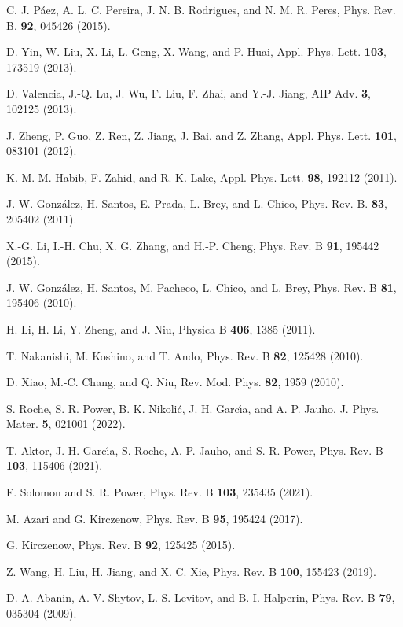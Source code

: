 \documentclass{jpsj3}
\begin{document}
\begin{thebibliography}{99}
 C. J. P\'{a}ez, 
A. L. C. Pereira, 
J. N. B. Rodrigues, and 
N. M. R. Peres, Phys. Rev. B. {\bf 92}, 045426 (2015).



D. Yin, W. Liu, X. Li, L. Geng, X. Wang, and P. Huai, Appl. Phys. Lett. {\bf 103}, 173519 (2013).

D. Valencia, J.-Q. Lu, J. Wu, F. Liu, F. Zhai, and Y.-J. Jiang, 
AIP Adv. {\bf 3}, 102125 (2013).

J. Zheng, P. Guo, Z. Ren, Z. Jiang, J. Bai, and Z. Zhang, Appl. Phys. Lett. {\bf 101}, 083101 (2012).

 K. M. M. Habib, F. Zahid, and R. K. Lake, 
Appl. Phys. Lett. {\bf 98}, 192112 (2011).

 J. W. Gonz\'{a}lez, H. Santos, E. Prada, L. Brey, and L. Chico, 
Phys. Rev. B. {\bf 83}, 205402 (2011).

X.-G. Li, I.-H. Chu, X. G. Zhang, and H.-P. Cheng, Phys. Rev. B {\bf 91}, 195442 (2015).


J. W. Gonz\'{a}lez, H. Santos, M. Pacheco, L. Chico, and L. Brey, 
Phys. Rev. B {\bf 81}, 195406 (2010).


H. Li, H. Li, Y. Zheng, and J. Niu, Physica B {\bf 406}, 1385 (2011).



 T. Nakanishi, M. Koshino, and T. Ando, Phys. Rev. B {\bf 82}, 125428 (2010).


D. Xiao, M.-C. Chang, and Q. Niu, Rev. Mod. Phys. {\bf 82}, 1959 (2010).


 S. Roche, S. R. Power, B. K. Nikoli\'{c}, J. H. Garc\'{\i}a, and A. P. Jauho,
 J. Phys. Mater. {\bf 5}, 021001 (2022).


 T. Aktor, J. H. Garc\'{\i}a, S. Roche, A.-P. Jauho, and S. R. Power, Phys. Rev. B {\bf 103}, 115406 (2021).

F. Solomon and S. R. Power, Phys. Rev. B {\bf 103}, 235435 (2021).

 M. Azari and G. Kirczenow, Phys. Rev. B {\bf 95}, 195424 (2017).

 G. Kirczenow, Phys. Rev. B {\bf 92}, 125425 (2015).


 Z. Wang, H. Liu, H. Jiang, and X. C. Xie, Phys. Rev. B {\bf 100}, 155423 (2019).


D. A. Abanin, A. V. Shytov, L. S. Levitov, and B. I. Halperin, Phys. Rev. B {\bf 79}, 035304 (2009).



\end{thebibliography}
\end{document}

